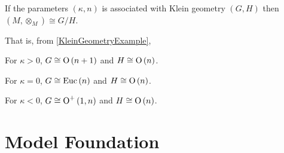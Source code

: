 \documentclass[stu, babel, american, biblatex, a4paper, leqno, draftall]{apa7}
\begin{document}
\begin{conjecture}\label{GeometricGroupStructure}
    If the parameters $\left(\kappa,n\right)$ is associated with Klein geometry $\left(G,H\right)$
    then $\left(M,\otimes_M\right)\cong G/H$.

    That is, from \cref{KleinGeometryExample},
    \begin{APAitemize}
        \item For $\kappa>0$, $G\cong\operatorname{O}\left(n+1\right)$ and $H\cong\operatorname{O}\left(n\right)$.
        \item For $\kappa=0$, $G\cong\operatorname{Euc}\left(n\right)$ and $H\cong\operatorname{O}\left(n\right)$.
        \item For $\kappa<0$, $G\cong\operatorname{O}^{+}\left(1,n\right)$ and $H\cong\operatorname{O}\left(n\right)$.
    \end{APAitemize}
\end{conjecture}

\section{Model Foundation}
\end{document}

